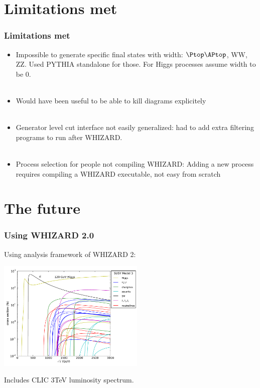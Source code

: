 \documentclass{beamer}
\newcommand{\whizard}{WHIZARD\xspace}
\begin{document}
\section{Limitations met}
\begin{frame}
\frametitle{Limitations met}
\begin{itemize}
  \item Impossible to generate specific final states with width: $\Ptop\APtop$,
  WW, ZZ. {\color{blue}Used PYTHIA standalone} for those. For Higgs processes
  assume width to be 0.\\
  ~\\
  \item Would have been useful to be able to {\color{blue}kill diagrams
  explicitely}\\
  ~\\
  \item Generator level cut interface not easily generalized: had to
  {\color{blue}add extra filtering programs} to run after \whizard.\\
  ~\\
  \item Process selection for people not compiling \whizard: Adding a
  {\color{blue}new process requires compiling a \whizard executable}, not easy
  from scratch
\end{itemize}
\end{frame}
\section{The future}
\begin{frame}
\frametitle{Using \whizard 2.0}
Using analysis framework of \whizard2:
\begin{center}
\includegraphics[width=7cm]{model3}
\end{center}
Includes CLIC 3TeV luminosity spectrum.
\end{frame}
\end{document}
